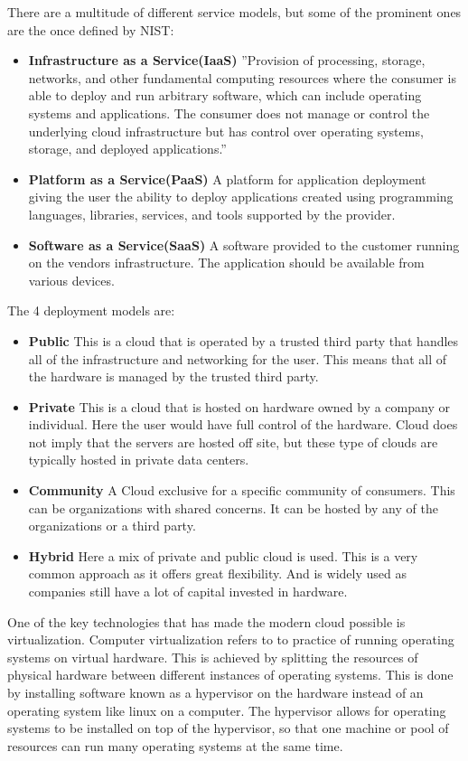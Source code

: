 \documentclass[]{uiophd}
\begin{document}
There are a multitude of different service models, but some of the prominent ones are the once defined by NIST:
\begin{itemize}
\item \textbf{Infrastructure as a Service(IaaS)} ''Provision of processing, storage, networks, and other fundamental computing resources where the consumer is able to deploy and run arbitrary software, which can include operating systems and applications. The consumer does not manage or control the underlying cloud infrastructure but has control over operating systems, storage, and deployed applications.''\cite{Mell:2011:SND:2206223}
\item \textbf{Platform as a Service(PaaS)} A platform for application deployment giving the user the ability to deploy applications created using programming languages, libraries, services, and tools supported by the provider.
\item \textbf{Software as a Service(SaaS)} A software provided to the customer running on the vendors infrastructure. The application should be available from various devices.
\end{itemize}

The 4 deployment models are:
\begin{itemize}
\item \textbf{Public} This is a cloud that is operated by a trusted third party that handles all of the infrastructure and networking for the user. This means that all of the hardware is managed by the trusted third party.
\item \textbf{Private} This is a cloud that is hosted on hardware owned by a company or individual. Here the user would have full control of the hardware. Cloud does not imply that the servers are hosted off site, but these type of clouds are typically hosted in private data centers.  
\item \textbf{Community} A Cloud exclusive for a specific community of consumers. This can be organizations with shared concerns. It can be hosted by any of the organizations or a third party. 
\item \textbf{Hybrid} Here a mix of private and public cloud is used. This is a very common approach as it offers great flexibility. And is widely used as companies still have a lot of capital invested in hardware.
\end{itemize}
 
One of the key technologies that has made the modern cloud possible is virtualization. Computer virtualization refers to to practice of running operating systems on virtual hardware. This is achieved by splitting the resources of physical hardware between different instances of operating systems. This is done by installing software known as a hypervisor on the hardware instead of an operating system like linux on a computer. The hypervisor allows for operating systems to be installed on top of the hypervisor, so that one machine or pool of resources can run many operating systems at the same time.\cite{1430631}
\end{document}
